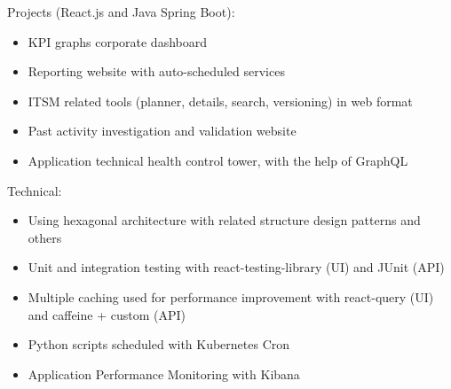 \documentclass[11pt,a4paper,ragged2e,withhyper]{altacv}
\begin{document}


\makecvheader


\vspace{-.5\baselineskip}
\begin{minipage}[t]{0.45\textwidth}
  \vspace{0pt}
Projects (React.js and Java Spring Boot):
\begin{itemize}
\item KPI graphs corporate dashboard
\item Reporting website with auto-scheduled services
\item ITSM related tools (planner, details, search, versioning) in web format
\item Past activity investigation and validation website
\item Application technical health control tower, with the help of GraphQL
\end{itemize}
\end{minipage}
\hfill
\begin{minipage}[t]{0.45\textwidth}
  \vspace{0pt}
 Technical:
\begin{itemize}
  \item Using hexagonal architecture with related structure design patterns and others
  \item Unit and integration testing with react-testing-library (UI) and JUnit (API)
  \item Multiple caching used for performance improvement with react-query (UI) and caffeine + custom (API)
  \item Python scripts scheduled with Kubernetes Cron
  \item Application Performance Monitoring with Kibana
\end{itemize}
\end{minipage}
\end{document}
